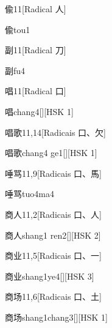 \begin{entry}{偸}{11}[Radical ⼈]
  \begin{phonetics}{偸}{tou1}
  \end{phonetics}
\end{entry}

\begin{entry}{副}{11}[Radical ⼑]
  \begin{phonetics}{副}{fu4}
  \end{phonetics}
\end{entry}

\begin{entry}{唱}{11}[Radical ⼝]
  \begin{phonetics}{唱}{chang4}[][HSK 1]
  \end{phonetics}
\end{entry}

\begin{entry}{唱歌}{11,14}[Radicais ⼝、⽋]
  \begin{phonetics}{唱歌}{chang4 ge1}[][HSK 1]
  \end{phonetics}
\end{entry}

\begin{entry}{唾骂}{11,9}[Radicais ⼝、⾺]
  \begin{phonetics}{唾骂}{tuo4ma4}
  \end{phonetics}
\end{entry}

\begin{entry}{商人}{11,2}[Radicais ⼝、⼈]
  \begin{phonetics}{商人}{shang1 ren2}[][HSK 2]
  \end{phonetics}
\end{entry}

\begin{entry}{商业}{11,5}[Radicais ⼝、⼀]
  \begin{phonetics}{商业}{shang1ye4}[][HSK 3]
  \end{phonetics}
\end{entry}

\begin{entry}{商场}{11,6}[Radicais ⼝、⼟]
  \begin{phonetics}{商场}{shang1chang3}[][HSK 1]
  \end{phonetics}
\end{entry}

